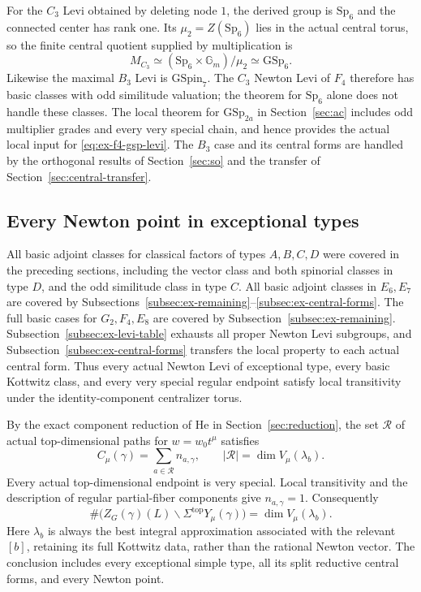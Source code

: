 \documentclass[11pt,a4paper]{article}
\theoremstyle{definition}
\theoremstyle{remark}
\begin{document}
For the \(C_3\) Levi obtained by deleting node \(1\), the derived group is
\(\mathrm{Sp}_6\) and the connected center has rank one.
Its \(\mu_2=Z(\mathrm{Sp}_6)\) lies in the actual central torus, so the
finite central quotient supplied by multiplication is
\begin{equation}\label{eq:ex-f4-gsp-levi}
M_{C_3}\simeq
(\mathrm{Sp}_6\times\mathbb G_m)/\mu_2
\simeq\mathrm{GSp}_6.
\end{equation}
Likewise the maximal \(B_3\) Levi is \(\mathrm{GSpin}_7\).
The \(C_3\) Newton Levi of \(F_4\) therefore has basic classes with odd
similitude valuation; the theorem for \(\mathrm{Sp}_6\) alone does not
handle these classes.
The local theorem for \(\mathrm{GSp}_{2a}\) in Section~\ref{sec:ac}
includes odd multiplier grades and every very special chain, and hence
provides the actual local input for \eqref{eq:ex-f4-gsp-levi}.
The \(B_3\) case and its central forms are handled by the orthogonal
results of Section~\ref{sec:so} and the transfer of
Section~\ref{sec:central-transfer}.

\subsection{Every Newton point in exceptional types}
\label{subsec:ex-all-newton}

All basic adjoint classes for classical factors of types \(A,B,C,D\)
were covered in the preceding sections, including the vector class and
both spinorial classes in type \(D\), and the odd similitude class in
type \(C\).
All basic adjoint classes in \(E_6,E_7\) are covered by
Subsections~\ref{subsec:ex-remaining}--\ref{subsec:ex-central-forms}.
The full basic cases for \(G_2,F_4,E_8\) are covered by
Subsection~\ref{subsec:ex-remaining}.
Subsection~\ref{subsec:ex-levi-table} exhausts all proper Newton Levi
subgroups, and Subsection~\ref{subsec:ex-central-forms} transfers the
local property to each actual central form.
Thus every actual Newton Levi of exceptional type, every basic Kottwitz
class, and every very special regular endpoint satisfy local transitivity
under the identity-component centralizer torus.

By the exact component reduction of He in Section~\ref{sec:reduction},
the set \(\mathcal R\) of actual top-dimensional paths for \(w=w_0t^\mu\)
satisfies
\begin{equation}\label{eq:ex-component-reduction}
C_\mu(\gamma)=\sum_{a\in\mathcal R}n_{a,\gamma},
\qquad |\mathcal R|=\dim V_\mu(\lambda_b).
\end{equation}
Every actual top-dimensional endpoint is very special.
Local transitivity and the description of regular partial-fiber components
give \(n_{a,\gamma}=1\).
Consequently
\begin{equation}\label{eq:ex-component-formula}
\#\bigl(Z_G(\gamma)(L)\backslash
\Sigma^{\mathrm{top}}Y_\mu(\gamma)\bigr)
=\dim V_\mu(\lambda_b).
\end{equation}
Here \(\lambda_b\) is always the best integral approximation associated
with the relevant \([b]\), retaining its full Kottwitz data, rather than
the rational Newton vector.
The conclusion includes every exceptional simple type, all its split
reductive central forms, and every Newton point.
\end{document}
